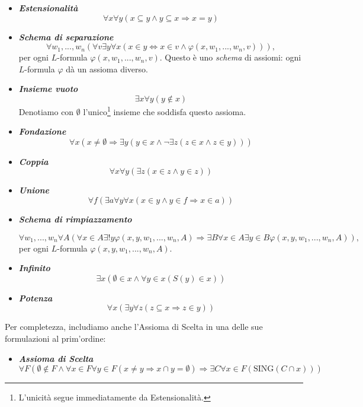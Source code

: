 \documentclass[12pt,a4paper]{report}
\theoremstyle{definition}
\theoremstyle{num.custom-title}
\renewcommand{\phi}{\varphi}
\begin{document}
\begin{itemize}
\item \emph{\textbf{Estensionalità}}
\[
\forall x \forall y (x \subseteq y \land y \subseteq x \Rightarrow x=y)
\]

\item \emph{\textbf{Schema di separazione}}
\[
\forall w_1,...,w_n (\forall v \exists y \forall x (x \in y \Leftrightarrow x \in v \land \phi(x,w_1,...,w_n,v))),
\]
per ogni $L$-formula $\phi(x,w_1,...,w_n,v)$. Questo è uno \emph{schema} di assiomi: ogni $L$-formula $\phi$ dà un assioma diverso.

\item \emph{\textbf{Insieme vuoto}}
\[
\exists x \forall y (y \notin x)
\]
Denotiamo con $\emptyset$ l'unico\footnote{L'unicità segue immediatamente da Estensionalità.} insieme che soddisfa questo assioma.

\item \emph{\textbf{Fondazione}}
\[
\forall x (x \neq \emptyset \Rightarrow \exists y (y \in x \land \neg \exists z (z \in x \land z \in y)  ))
\]

\item \emph{\textbf{Coppia}}
\[
\forall x \forall y ( \exists z (x \in z \land y \in z))
\]

\item \emph{\textbf{Unione}}
\[
\forall f ( \exists a \forall y \forall x (x \in y \land y \in f \Rightarrow x \in a))
\]

\item \emph{\textbf{Schema di rimpiazzamento}}

\[
\forall w_1,...,w_n \forall A( \forall x \in A \exists ! y \phi(x,y,w_1,...,w_n,A) \Rightarrow \exists B \forall x \in A \exists y \in B \phi (x,y,w_1,...,w_n,A)),
\]
per ogni $L$-formula $\phi(x,y,w_1,...,w_n,A)$.


\item \emph{\textbf{Infinito}}
\[
\exists x (\emptyset \in x \land \forall y \in x (S(y) \in x) )
\]

\item \emph{\textbf{Potenza}}
\[
\forall x ( \exists y \forall z (z \subseteq x \Rightarrow z \in y ))
\]
\end{itemize}
Per completezza, includiamo anche l'Assioma di Scelta in una delle sue formulazioni al prim'ordine:
\begin{itemize}
\item \emph{\textbf{Assioma di Scelta}}
\[
\forall F ( \emptyset \notin F \land \forall x \in F \forall y \in F (x \neq y  \Rightarrow x \cap y= \emptyset ) \Rightarrow \exists C \forall x \in F (\mathrm{SING}(C \cap x)) )
\]
\end{itemize}
\end{document}
